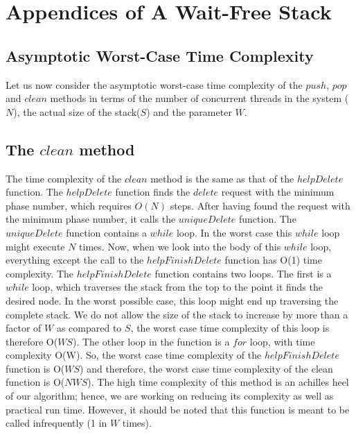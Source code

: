 \documentclass{llncs}
\begin{document}
\section* {\textbf{Appendices of A Wait-Free Stack}}
\begin{appendix}

\section{Asymptotic Worst-Case Time Complexity }
Let us now consider the asymptotic worst-case time complexity of the $push$, $pop$ and $clean$ methods
in terms of the number of concurrent threads in the system ($N$), the actual size of the
stack($S$) and the parameter $W$. 

\subsection{The $clean$ method}
The time complexity of the $clean$ method is the same as that of the
$helpDelete$ function. The $helpDelete$ function finds the $delete$ 
request with the minimum phase number, which requires $O(N)$ steps. 
After having found the request with the minimum phase number, it calls 
the $uniqueDelete$ function. The $uniqueDelete$ function contains a $while$ 
loop. In the worst case this $while$ loop might execute $N$ times. Now, when 
we look into the body of this $while$ loop, everything except the call to 
the $helpFinishDelete$ function has O(1) time complexity. The $helpFinishDelete$ 
function contains two loops. The first is a $while$ loop, which traverses 
the stack from the top to the point it finds the desired node. In the 
worst possible case, this loop might end up traversing the complete stack.
We do not allow the size of the stack to increase by more than 
a factor of $W$ as compared to $S$, the worst case time complexity of this loop is therefore
O($WS$). 
The other loop in the function is a $for$ loop, with time complexity O(W). 
So, the worst case time complexity of the $helpFinishDelete$ function is O($WS$) 
and therefore, the worst case time complexity of the clean function is O($NWS$).
The high time complexity of this method is an achilles heel of our algorithm; hence, we
are working on reducing its complexity as well as practical run time.
However, it should be noted that this function is meant to be called infrequently (1 in
$W$ times). 



\end{appendix}
\end{document}
